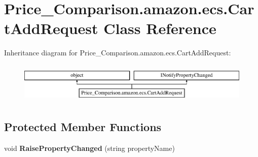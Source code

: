 \hypertarget{class_price___comparison_1_1amazon_1_1ecs_1_1_cart_add_request}{\section{Price\-\_\-\-Comparison.\-amazon.\-ecs.\-Cart\-Add\-Request Class Reference}
\label{class_price___comparison_1_1amazon_1_1ecs_1_1_cart_add_request}
}


 


Inheritance diagram for Price\-\_\-\-Comparison.\-amazon.\-ecs.\-Cart\-Add\-Request\-:\begin{figure}[H]
\begin{center}
\leavevmode
\includegraphics[height=1.931034cm]{class_price___comparison_1_1amazon_1_1ecs_1_1_cart_add_request}
\end{center}
\end{figure}
\subsection*{Protected Member Functions}
\begin{DoxyCompactItemize}
\item 
\hypertarget{class_price___comparison_1_1amazon_1_1ecs_1_1_cart_add_request_abfa80af643d9a5b56fb6452c7f9cd470}{void {\bfseries Raise\-Property\-Changed} (string property\-Name)}\label{class_price___comparison_1_1amazon_1_1ecs_1_1_cart_add_request_abfa80af643d9a5b56fb6452c7f9cd470}

\end{DoxyCompactItemize}

